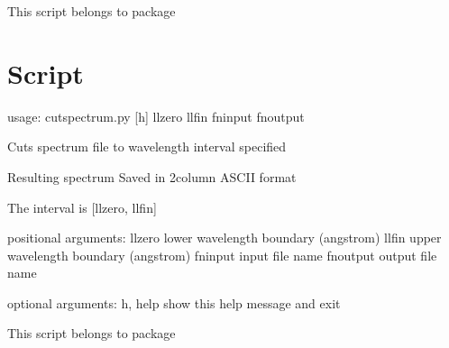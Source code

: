 \documentclass[letterpaper,10pt,english]{sphinxmanual}
\begin{document}
This script belongs to package 


\section{Script }
\label{\detokenize{autoscripts/script-cut-spectrum::doc}}\label{\detokenize{autoscripts/script-cut-spectrum:script-cut-spectrum-py}}
\begin{sphinxVerbatim}[commandchars=\\\{\}]
usage: cut\PYGZhy{}spectrum.py [\PYGZhy{}h] llzero llfin fn\PYGZus{}input fn\PYGZus{}output

Cuts spectrum file to wavelength interval specified

Resulting spectrum Saved in 2\PYGZhy{}column ASCII format

The interval is [llzero, llfin]

positional arguments:
  llzero      lower wavelength boundary (angstrom)
  llfin       upper wavelength boundary (angstrom)
  fn\PYGZus{}input    input file name
  fn\PYGZus{}output   output file name

optional arguments:
  \PYGZhy{}h, \PYGZhy{}\PYGZhy{}help  show this help message and exit
\end{sphinxVerbatim}

This script belongs to package 
\end{document}
